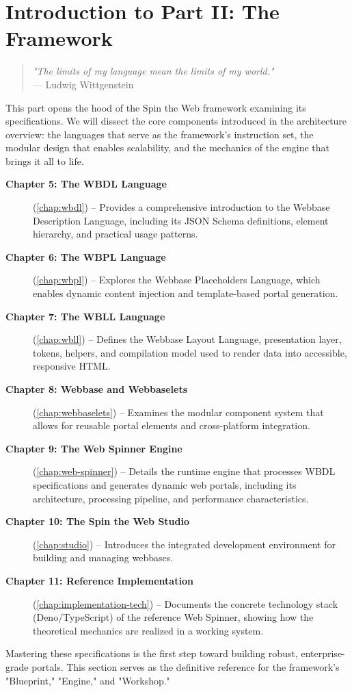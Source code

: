 
\chapter*{Introduction to Part II: The Framework}
\label{part:framework}

\begin{quote}
\textit{"The limits of my language mean the limits of my world."} \\
— Ludwig Wittgenstein
\end{quote}

This part opens the hood of the Spin the Web framework examining its specifications. We will dissect the core components introduced in the architecture overview: the languages that serve as the framework's instruction set, the modular design that enables scalability, and the mechanics of the engine that brings it all to life.

\begin{description}
\item[\textbf{Chapter 5: The WBDL Language}] (\cref{chap:wbdl}) -- Provides a comprehensive introduction to the Webbase Description Language, including its JSON Schema definitions, element hierarchy, and practical usage patterns.

\item[\textbf{Chapter 6: The WBPL Language}] (\cref{chap:wbpl}) -- Explores the Webbase Placeholders Language, which enables dynamic content injection and template-based portal generation.

\item[\textbf{Chapter 7: The WBLL Language}] (\cref{chap:wbll}) -- Defines the Webbase Layout Language, presentation layer, tokens, helpers, and compilation model used to render data into accessible, responsive HTML.

\item[\textbf{Chapter 8: Webbase and Webbaselets}] (\cref{chap:webbaselets}) -- Examines the modular component system that allows for reusable portal elements and cross-platform integration.

\item[\textbf{Chapter 9: The Web Spinner Engine}] (\cref{chap:web-spinner}) -- Details the runtime engine that processes WBDL specifications and generates dynamic web portals, including its architecture, processing pipeline, and performance characteristics.

\item[\textbf{Chapter 10: The Spin the Web Studio}] (\cref{chap:studio}) -- Introduces the integrated development environment for building and managing webbases.

\item[\textbf{Chapter 11: Reference Implementation}] (\cref{chap:implementation-tech}) -- Documents the concrete technology stack (Deno/TypeScript) of the reference Web Spinner, showing how the theoretical mechanics are realized in a working system.
\end{description}

Mastering these specifications is the first step toward building robust, enterprise-grade portals. This section serves as the definitive reference for the framework's "Blueprint," "Engine," and "Workshop."
